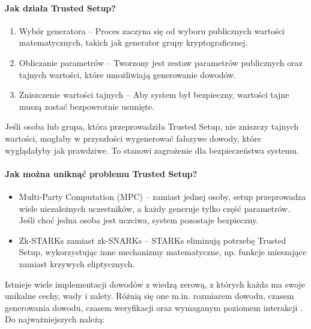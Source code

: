 \documentclass{article}
\begin{document}
\paragraph{Jak działa Trusted Setup?}
\begin{enumerate}
    \item Wybór generatora – Proces zaczyna się od wyboru publicznych wartości matematycznych, takich jak generator grupy kryptograficznej.
    \item Obliczanie parametrów – Tworzony jest zestaw parametrów publicznych oraz tajnych wartości, które umożliwiają generowanie dowodów.
    \item Zniszczenie wartości tajnych – Aby system był bezpieczny, wartości tajne muszą zostać bezpowrotnie usunięte.
\end{enumerate}

Jeśli osoba lub grupa, która przeprowadziła Trusted Setup, nie zniszczy tajnych wartości, mogłaby w przyszłości wygenerować fałszywe dowody, 
które wyglądałyby jak prawdziwe. To stanowi zagrożenie dla bezpieczeństwa systemu.

\paragraph{Jak można uniknąć problemu Trusted Setup?}
\begin{itemize}
    \item Multi-Party Computation (MPC) – zamiast jednej osoby, setup przeprowadza wiele niezależnych uczestników, a każdy generuje tylko część parametrów. Jeśli choć jedna osoba jest uczciwa, system pozostaje bezpieczny.
    \item Zk-STARKs zamiast zk-SNARKs – STARKs eliminują potrzebę Trusted Setup, wykorzystując inne mechanizmy matematyczne, np. funkcje mieszające zamiast krzywych eliptycznych.
\end{itemize}




Istnieje wiele implementacji dowodów z wiedzą zerową, z których każda ma swoje unikalne cechy, wady i zalety. Różnią się one m.in. rozmiarem dowodu, czasem generowania dowodu, czasem weryfikacji oraz wymaganym poziomem interakcji \cite{zkp_chainlink}. Do najważniejszych należą:
\end{document}
